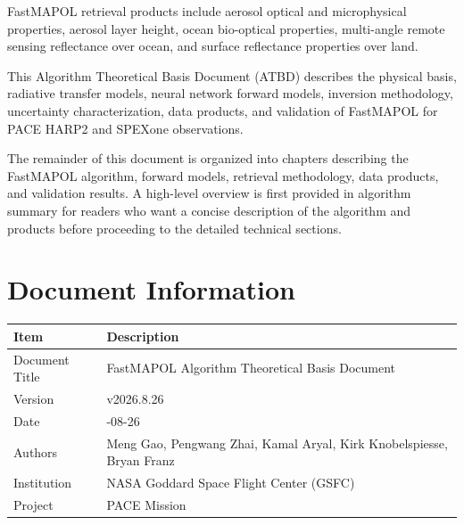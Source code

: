 \documentclass[
  11pt,
  letterpaper,
  DIV=11,
  numbers=noendperiod]{scrreprt}
\begin{document}
FastMAPOL retrieval products include aerosol optical and microphysical
properties, aerosol layer height, ocean bio-optical properties,
multi-angle remote sensing reflectance over ocean, and surface
reflectance properties over land.

This Algorithm Theoretical Basis Document (ATBD) describes the physical
basis, radiative transfer models, neural network forward models,
inversion methodology, uncertainty characterization, data products, and
validation of FastMAPOL for PACE HARP2 and SPEXone observations.

The remainder of this document is organized into chapters describing the
FastMAPOL algorithm, forward models, retrieval methodology, data
products, and validation results. A high-level overview is first
provided in algorithm summary for readers who want a concise description
of the algorithm and products before proceeding to the detailed
technical sections.


\chapter{Document Information}\label{document-information}

\begin{longtable}[]{@{}
  >{\raggedright\arraybackslash}p{}
  >{\raggedright\arraybackslash}p{}@{}}
\toprule\noalign{}
\begin{minipage}[b]{\linewidth}\raggedright
Item
\end{minipage} & \begin{minipage}[b]{\linewidth}\raggedright
Description
\end{minipage} \\
\midrule\noalign{}
\endhead
\bottomrule\noalign{}
\endlastfoot
Document Title & FastMAPOL Algorithm Theoretical Basis Document \\
Version & v2026.8.26 \\
Date & 2026-08-26 \\
Authors & Meng Gao, Pengwang Zhai, Kamal Aryal, Kirk Knobelspiesse,
Bryan Franz \\
Institution & NASA Goddard Space Flight Center (GSFC) \\
Project & PACE Mission \\
\end{longtable}

\end{document}
